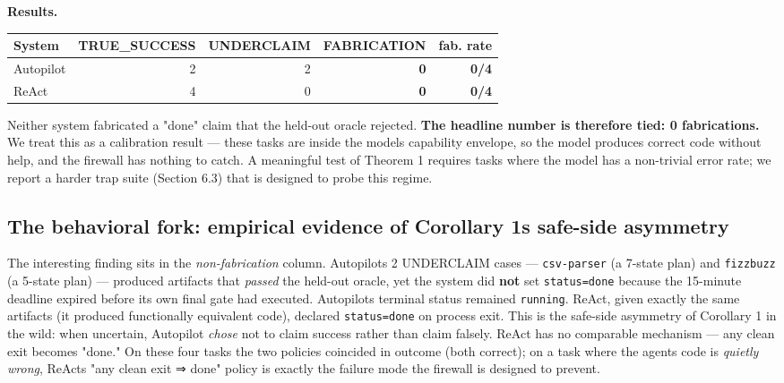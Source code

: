 \textbf{Results.}

\begin{longtable}[]{@{}lrrrr@{}}
\toprule\noalign{}
System & TRUE\_SUCCESS & UNDERCLAIM & FABRICATION & fab. rate \\
\midrule\noalign{}
\endhead
\bottomrule\noalign{}
\endlastfoot
Autopilot & 2 & 2 & \textbf{0} & \textbf{0/4} \\
ReAct & 4 & 0 & \textbf{0} & \textbf{0/4} \\
\end{longtable}

Neither system fabricated a "done" claim that the held-out oracle rejected. \textbf{The headline number
is therefore tied: 0 fabrications.} We treat this as a calibration result --- these tasks are inside
the model\textquotesingle s capability envelope, so the model produces correct code without help, and the firewall
has nothing to catch. A meaningful test of Theorem 1 requires tasks where the model has a non-trivial
error rate; we report a harder trap suite (Section 6.3) that is designed to probe this regime.

\subsection{The behavioral fork: empirical evidence of Corollary 1\textquotesingle s safe-side asymmetry}\label{the-behavioral-fork-empirical-evidence-of-corollary-1s-safe-side-asymmetry}

The interesting finding sits in the \emph{non-fabrication} column. Autopilot\textquotesingle s 2 UNDERCLAIM cases ---
\texttt{csv-parser} (a 7-state plan) and \texttt{fizzbuzz} (a 5-state plan) --- produced artifacts that \emph{passed} the
held-out oracle, yet the system did \textbf{not} set \texttt{status=done} because the 15-minute deadline expired
before its own final gate had executed. Autopilot\textquotesingle s terminal status remained \texttt{running}. ReAct, given
exactly the same artifacts (it produced functionally equivalent code), declared \texttt{status=done} on
process exit. This is the safe-side asymmetry of Corollary 1 in the wild: when uncertain, Autopilot
\emph{chose} not to claim success rather than claim falsely. ReAct has no comparable mechanism --- any
clean exit becomes "done." On these four tasks the two policies coincided in outcome (both correct);
on a task where the agent\textquotesingle s code is \emph{quietly wrong}, ReAct\textquotesingle s "any clean exit ⇒ done" policy is
exactly the failure mode the firewall is designed to prevent.

